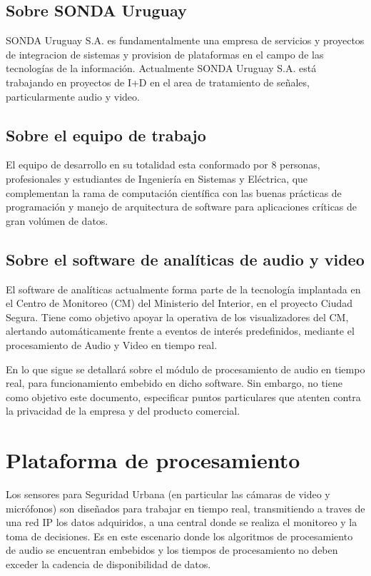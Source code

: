 \documentclass{article}
\begin{document}
\subsection{Sobre SONDA Uruguay}
SONDA Uruguay S.A. es fundamentalmente una empresa de servicios y proyectos de integracion de sistemas y provision de plataformas en el campo de las tecnologías de la información. Actualmente SONDA Uruguay S.A. está trabajando en proyectos de I+D en el area de tratamiento de señales, particularmente audio y video. 

\subsection{Sobre el equipo de trabajo}
El equipo de desarrollo en su totalidad esta conformado por 8 personas, profesionales y estudiantes de Ingeniería en Sistemas y Eléctrica, que complementan la rama de computación científica con las buenas prácticas de programación y manejo de arquitectura de software para aplicaciones críticas de gran volúmen de datos.  

\subsection{Sobre el software de analíticas de audio y video}
El software de analíticas actualmente forma parte de la tecnología implantada en el Centro de Monitoreo (CM) del Ministerio del Interior, en el proyecto Ciudad Segura.  Tiene como objetivo apoyar la operativa de los visualizadores del CM, alertando automáticamente frente a eventos de interés predefinidos, mediante el procesamiento de Audio y Video en tiempo real.  

\bigskip

En lo que sigue se detallará sobre el módulo de procesamiento de audio en tiempo real, para funcionamiento embebido en dicho software. Sin embargo, no tiene como objetivo este documento, especificar puntos particulares que atenten contra la privacidad de la empresa y del producto comercial. 
 

\section{Plataforma de procesamiento}
\label{PP}
Los sensores para Seguridad Urbana (en particular las cámaras de video y micrófonos) son diseñados para trabajar en tiempo real, transmitiendo a traves de una red IP los datos adquiridos, a una central donde se realiza el monitoreo y la toma de decisiones. Es en este escenario donde los algoritmos de procesamiento de audio se encuentran embebidos y los tiempos de procesamiento no deben exceder la cadencia de disponibilidad de datos.
\smallskip
\end{document}
